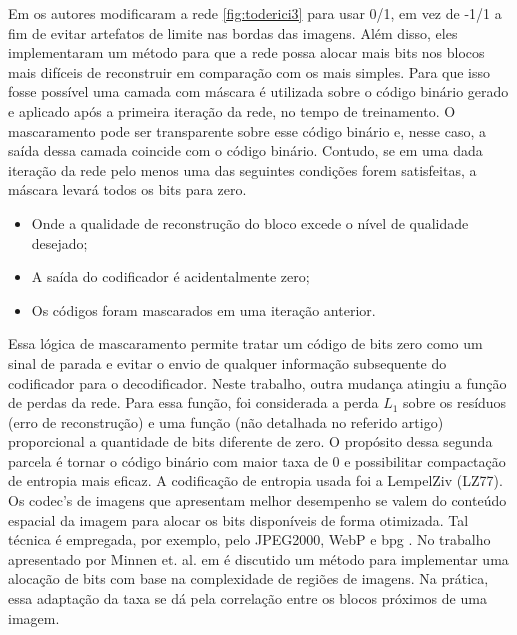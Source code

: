 Em \cite{target} os autores modificaram a rede \ref{fig:toderici3} 
para usar 0/1, em vez de -1/1 a fim de evitar artefatos de limite nas bordas das imagens. Além disso, eles implementaram um método para que a rede possa alocar mais bits nos blocos mais difíceis de reconstruir em comparação com os mais simples. 
Para que isso fosse possível uma camada com máscara é utilizada sobre o código binário gerado e aplicado após a primeira iteração da rede, no tempo de treinamento.
O mascaramento pode ser transparente sobre esse código binário e, nesse caso, a saída dessa camada coincide com o código binário. Contudo, se em uma dada iteração da rede pelo menos uma das seguintes condições forem satisfeitas, a máscara levará todos os bits para zero. 

\begin{itemize}
	\item  Onde a qualidade de reconstrução do bloco excede o nível de qualidade desejado;
	\item A saída do codificador é acidentalmente zero;
	\item Os códigos foram mascarados em uma iteração anterior.
\end{itemize}

Essa lógica de mascaramento permite tratar um código de bits zero como um sinal de parada e evitar o envio de qualquer informação subsequente do codificador para o decodificador.  Neste trabalho, outra mudança atingiu a função de perdas da rede. Para essa função, foi considerada a perda $L_1$ sobre os resíduos (erro de reconstrução) e uma função (não detalhada no referido artigo) proporcional a quantidade de bits diferente de zero. O propósito dessa segunda parcela  é tornar o código binário com maior taxa de 0 e possibilitar compactação de entropia mais eficaz. A codificação de entropia usada foi a LempelZiv (LZ77). 
Os \acrshort{codec}'s de imagens que apresentam melhor desempenho se valem do conteúdo espacial da imagem para alocar os bits disponíveis de forma otimizada. Tal técnica é empregada, por exemplo, pelo JPEG2000, WebP e \acrshort{bpg} \cite{boliek2000information}. No trabalho apresentado por Minnen et. al. em \cite{SpatiallyAdaptive2018Minnen} é discutido um método para implementar uma alocação de bits com base na complexidade de regiões de imagens. Na prática, essa adaptação da taxa se dá pela correlação entre os blocos próximos de uma imagem. 


